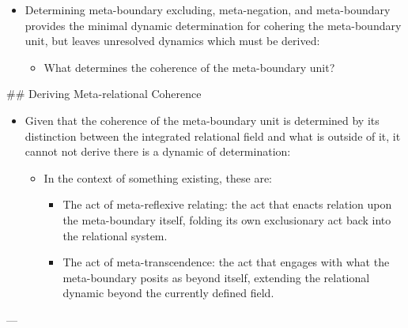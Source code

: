 \documentclass[11pt]{article}
\begin{document}
\begin{itemize}
\begin{itemize}
\item In the context of something existing, this is the structure of meta-boundary: the minimal structural form that formalizes and stabilizes the division between the integrated relational field and what is outside it.
\item This structure preserves meta-level invariants: the meta-boundary maintains positional differentiation and type-homogeneity, ensuring that meta-level dynamics remain consistent with foundational relational logic.
\end{itemize}
\item Determining meta-boundary excluding, meta-negation, and meta-boundary provides the minimal dynamic determination for cohering the meta-boundary unit, but leaves unresolved dynamics which must be derived:

\begin{itemize}
\item What determines the coherence of the meta-boundary unit?
\end{itemize}
\end{itemize}
\#\# Deriving Meta-relational Coherence
\begin{itemize}
\item Given that the coherence of the meta-boundary unit is determined by its distinction between the integrated relational field and what is outside of it, it cannot not derive there is a dynamic of determination:

\begin{itemize}
\item In the context of something existing, these are:

\begin{itemize}
\item The act of meta-reflexive relating: the act that enacts relation upon the meta-boundary itself, folding its own exclusionary act back into the relational system.

\item The act of meta-transcendence: the act that engages with what the meta-boundary posits as beyond itself, extending the relational dynamic beyond the currently defined field.
\end{itemize}
\end{itemize}
\end{itemize}


---
\end{document}
